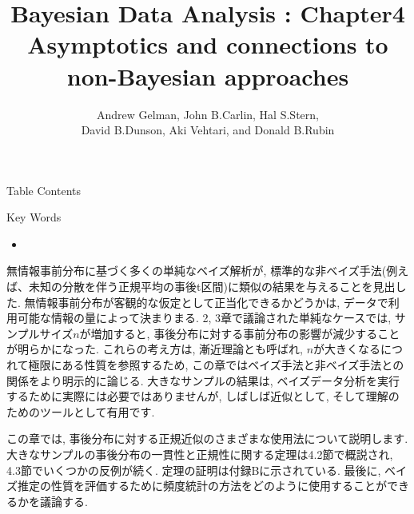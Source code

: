 \documentclass[10pt,dvipdfmx,a4]{beamer}
\title{Bayesian Data Analysis : Chapter4 \\Asymptotics and connections to non-Bayesian approaches}
\subtitle{Andrew Gelman, John B.Carlin, Hal S.Stern,\\David B.Dunson, Aki Vehtari, and Donald B.Rubin}
\begin{document}
\frame{\titlepage}

\begin{frame}{Table Contents}
\begin{multicols}{2}
{\scriptsize \tableofcontents}
\end{multicols}
\end{frame}

\begin{frame}{Key Words}
\begin{multicols}{2}
{\scriptsize \begin{itemize}
\item 
\end{itemize}}
\end{multicols}
\end{frame}


\begin{frame}
無情報事前分布に基づく多くの単純なベイズ解析が, 標準的な非ベイズ手法(例えば、未知の分散を伴う正規平均の事後t区間)に類似の結果を与えることを見出した.
無情報事前分布が客観的な仮定として正当化できるかどうかは, データで利用可能な情報の量によって決まりまる.
2, 3章で議論された単純なケースでは, サンプルサイズ$n$が増加すると, 事後分布に対する事前分布の影響が減少することが明らかになった.
これらの考え方は, 漸近理論とも呼ばれ, $n$が大きくなるにつれて極限にある性質を参照するため, この章ではベイズ手法と非ベイズ手法との関係をより明示的に論じる.
大きなサンプルの結果は, ベイズデータ分析を実行するために実際には必要ではありませんが, しばしば近似として, そして理解のためのツールとして有用です.

この章では, 事後分布に対する正規近似のさまざまな使用法について説明します.
大きなサンプルの事後分布の一貫性と正規性に関する定理は4.2節で概説され, 4.3節でいくつかの反例が続く.
定理の証明は付録Bに示されている.
最後に, ベイズ推定の性質を評価するために頻度統計の方法をどのように使用することができるかを議論する.
\end{frame}

\end{document}
